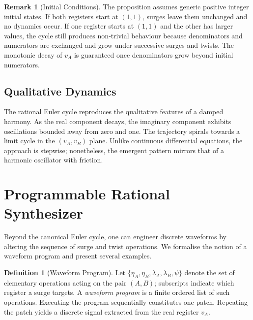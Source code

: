 \documentclass[11pt, letterpaper]{article}
\newcommand{\lop}{\lambda}
\newcommand{\aop}{\eta}
\newcommand{\psiop}{\psi}
\theoremstyle{definition}
\newtheorem{definition}{Definition}[section]
\newtheorem{remark}{Remark}[section]
\theoremstyle{plain}
\begin{document}
\begin{remark}[Initial Conditions]
The proposition assumes generic positive integer initial states.  If both
registers start at $(1,1)$, surges leave them unchanged and no dynamics occur.
If one register starts at $(1,1)$ and the other has larger values, the
cycle still produces non‑trivial behaviour because denominators and
numerators are exchanged and grow under successive surges and twists.  The
monotonic decay of $v_A$ is guaranteed once denominators grow beyond
initial numerators.
\end{remark}

\subsection{Qualitative Dynamics}

The rational Euler cycle reproduces the qualitative features of a damped
harmony.  As the real component decays, the imaginary component exhibits
oscillations bounded away from zero and one.  The trajectory spirals towards
a limit cycle in the $(v_A,v_B)$ plane.  Unlike continuous differential
equations, the approach is stepwise; nonetheless, the emergent pattern
mirrors that of a harmonic oscillator with friction.

\section{Programmable Rational Synthesizer}

Beyond the canonical Euler cycle, one can engineer discrete waveforms by
altering the sequence of surge and twist operations.  We formalise the notion
of a waveform program and present several examples.

\begin{rsbox}
  \begin{definition}[Waveform Program]
  Let $\{\aop_A, \aop_B, \lop_A, \lop_B, \psiop\}$ denote the set of
  elementary operations acting on the pair $(A,B)$; subscripts indicate which
  register a surge targets.  A \emph{waveform program} is a finite ordered
  list of such operations.  Executing the program sequentially constitutes
  one patch.  Repeating the patch yields a discrete signal extracted from
  the real register $v_A$.
  \end{definition}
\end{rsbox}
\end{document}

